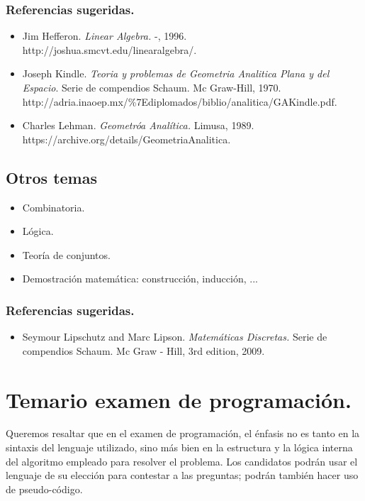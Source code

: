 \documentclass[10pt,a4paper]{book}
\begin{document}
\subsubsection{Referencias sugeridas.}

\begin{itemize}
	\item Jim Hefferon. \textit{Linear Algebra.} -, 1996. http://joshua.smcvt.edu/linearalgebra/.
	\item Joseph Kindle. \textit{Teoria y problemas de Geometria Analitica Plana y del Espacio}. Serie de compendios Schaum. Mc Graw-Hill, 1970. http://adria.inaoep.mx/\%7Ediplomados/biblio/analitica/GAKindle.pdf.
	\item Charles Lehman. \textit{Geometróa Analítica.} Limusa, 1989. https://archive.org/details/GeometriaAnalitica.
\end{itemize}
\newpage
\subsection{Otros temas}

\begin{itemize}
	\item Combinatoria.	
	\item Lógica.
	\item Teoría de conjuntos.
	\item Demostración matemática: construcción, inducción, ...
\end{itemize}

\subsubsection{Referencias sugeridas.}
\begin{itemize}
	\item Seymour Lipschutz and Marc Lipson. \textit{Matemáticas Discretas.} Serie de compendios Schaum. Mc Graw - Hill, 3rd edition, 2009.
\end{itemize}
\newpage
\section{Temario examen de programación.}
Queremos resaltar que en el examen de programación, el énfasis no es tanto en la sintaxis del lenguaje utilizado, sino más bien en la estructura y la lógica interna del algoritmo empleado para resolver el problema. Los candidatos podrán usar el lenguaje de su elección para contestar a las preguntas; podrán también hacer uso de pseudo-código.
\end{document}
